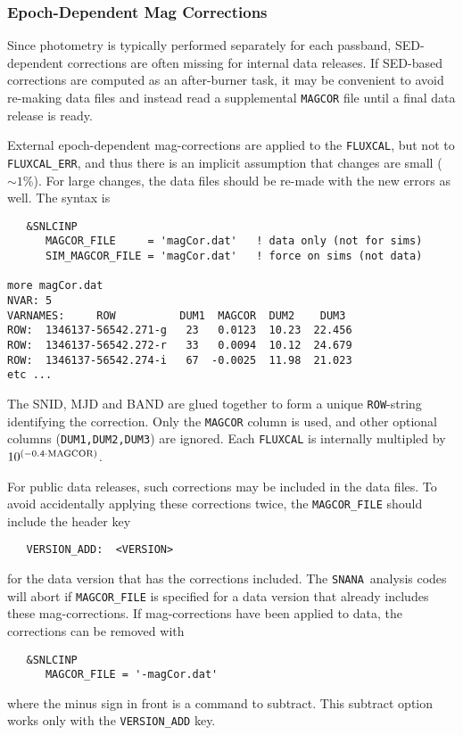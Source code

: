 \documentclass[12pt]{article}
\newcommand{\snana}{{\tt SNANA}}
\begin{document}
\clearpage
\subsubsection{Epoch-Dependent Mag Corrections}
\label{sss:magcor}

Since photometry is typically performed separately for each passband,
SED-dependent corrections are often missing for internal data
releases. If SED-based corrections are computed as an after-burner
task, it may be convenient to avoid re-making data files and instead
read a supplemental {\tt MAGCOR} file until a final data release is ready.

External epoch-dependent mag-corrections are applied to the {\tt FLUXCAL}, 
but not to {\tt FLUXCAL\_ERR},
and thus there is an implicit assumption that changes
are small ($\sim 1$\%).
For large changes, the data files should be re-made 
with the new errors as well. The syntax is
%
\begin{verbatim}
   &SNLCINP
      MAGCOR_FILE     = 'magCor.dat'   ! data only (not for sims)
      SIM_MAGCOR_FILE = 'magCor.dat'   ! force on sims (not data)

more magCor.dat
NVAR: 5
VARNAMES:     ROW          DUM1  MAGCOR  DUM2    DUM3
ROW:  1346137-56542.271-g   23   0.0123  10.23  22.456
ROW:  1346137-56542.272-r   33   0.0094  10.12  24.679
ROW:  1346137-56542.274-i   67  -0.0025  11.98  21.023
etc ...
\end{verbatim}
The SNID, MJD and BAND are glued together to form
a unique {\tt ROW}-string identifying the correction. 
Only the {\tt MAGCOR} column is used, and other optional
columns ({\tt DUM1,DUM2,DUM3}) are ignored.
Each {\tt FLUXCAL} is internally multipled by 
$10^{(-0.4\cdot {\rm MAGCOR})}$.

For public data releases, such corrections may be included
in the data files. To avoid accidentally applying these
corrections twice, the {\tt MAGCOR\_FILE} should include
the header key
\begin{verbatim}
   VERSION_ADD:  <VERSION>
\end{verbatim}
%
for the data version that has the corrections included.
The \snana\ analysis codes will abort if {\tt MAGCOR\_FILE}
is specified for a data version that already includes these
mag-corrections.   
If mag-corrections have been applied to data,
the corrections can be removed with 
\begin{verbatim}
   &SNLCINP
      MAGCOR_FILE = '-magCor.dat'
\end{verbatim}
%
where the minus sign in front is a command to subtract.
This subtract option works only with the {\tt VERSION\_ADD} key.
\end{document}
